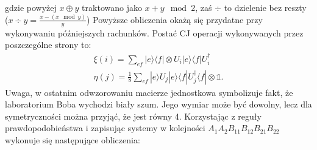 \documentclass[10pt]{article} %
\newcommand{\Ket}[1]{|#1\rangle}
\newcommand{\Bra}[1]{\langle#1|}
\newcommand{\I}{\mathbb{1}}
\begin{document}
gdzie powyżej $x \oplus y$ traktowano jako $x + y \mod 2$, zaś $\div$ to dzielenie bez reszty ($x \div y = \frac{x - (x \mod y)}{y}$) Powyższe obliczenia okażą się przydatne przy wykonywaniu późniejszych rachunków.
Postać CJ operacji wykonywanych przez poszczególne strony to:
\begin{gather}
\xi(i) = \sum_{ef} \Ket{e}\Bra{f} \otimes U_i \Ket{e}\Bra{f} U_i^\dag  \\
\eta(j) = \frac{1}{8}\sum_{ef}  \Ket{e} U_j \Ket{e}\Bra{f} U_j^\dag\Bra{f} \otimes \I.
\end{gather} Uwaga, w ostatnim odwzorowaniu macierze jednostkowa symbolizuje fakt, że laboratorium Boba wychodzi biały szum. Jego wymiar może być dowolny, lecz dla symetryczności można przyjąć, że jest równy 4. Korzystając z reguły prawdopodobieństwa i zapisując systemy w kolejności $A_{1} A_2 B_{11} B_{12} B_{21} B_{22}$ wykonuje się następujące obliczenia:
\end{document}

